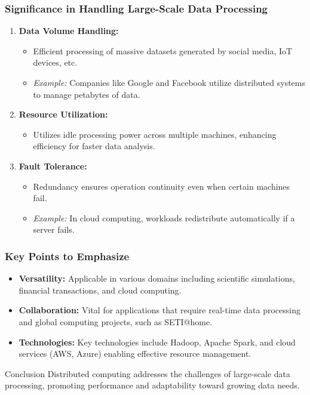 \documentclass[aspectratio=169]{beamer}
\begin{document}
\begin{frame}[fragile]
    \frametitle{Significance in Handling Large-Scale Data Processing}
    \begin{enumerate}
        \item \textbf{Data Volume Handling:}
        \begin{itemize}
            \item Efficient processing of massive datasets generated by social media, IoT devices, etc.
            \item \textit{Example:} Companies like Google and Facebook utilize distributed systems to manage petabytes of data.
        \end{itemize}
        
        \item \textbf{Resource Utilization:}
        \begin{itemize}
            \item Utilizes idle processing power across multiple machines, enhancing efficiency for faster data analysis.
        \end{itemize}
        
        \item \textbf{Fault Tolerance:}
        \begin{itemize}
            \item Redundancy ensures operation continuity even when certain machines fail.
            \item \textit{Example:} In cloud computing, workloads redistribute automatically if a server fails.
        \end{itemize}
    \end{enumerate}
\end{frame}

\begin{frame}[fragile]
    \frametitle{Key Points to Emphasize}
    \begin{itemize}
        \item \textbf{Versatility:} Applicable in various domains including scientific simulations, financial transactions, and cloud computing.
        \item \textbf{Collaboration:} Vital for applications that require real-time data processing and global computing projects, such as SETI@home.
        \item \textbf{Technologies:} Key technologies include Hadoop, Apache Spark, and cloud services (AWS, Azure) enabling effective resource management.
    \end{itemize}
    
    \begin{block}{Conclusion}
        Distributed computing addresses the challenges of large-scale data processing, promoting performance and adaptability toward growing data needs.
    \end{block}
\end{frame}
\end{document}
